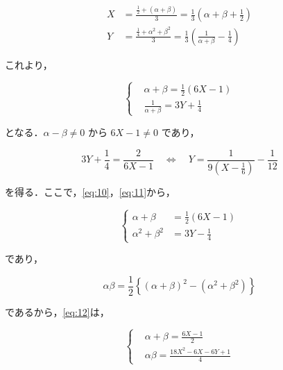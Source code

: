 \documentclass[a4paper]{ltjsarticle}
\begin{document}
\begin{align}
    X & =\frac{\frac{1}{2}+(\alpha+\beta)}{3}=\frac{1}{3}\left(\alpha+\beta+\frac{1}{2}\right)\label{eq:10}             \\
    Y & =\frac{\frac{1}{4}+\alpha^2+\beta^2}{3}=\frac{1}{3}\left(\frac{1}{\alpha+\beta}-\frac{1}{4}\right)\label{eq:11}
\end{align}

これより，

\begin{equation}
    \left\{\begin{aligned}
         & \alpha+\beta=\frac{1}{2}(6X-1)        \\
         & \frac{1}{\alpha+\beta}=3Y+\frac{1}{4}
    \end{aligned}\right.\label{eq:12}
\end{equation}

となる．$\alpha-\beta\neq 0$ から $6X-1\neq 0$ であり，

\begin{equation}
    3Y+\frac{1}{4}=\frac{2}{6X-1}\quad\Longleftrightarrow\quad Y=\frac{1}{9(X-\frac{1}{6})}-\frac{1}{12}\label{eq:13}
\end{equation}

を得る．ここで，\eqref{eq:10}，\eqref{eq:11}から，

\begin{equation*}
    \left\{\begin{aligned}
        \alpha+\beta     & =\frac{1}{2}(6X-1) \\
        \alpha^2+\beta^2 & =3Y-\frac{1}{4}
    \end{aligned}\right.
\end{equation*}

であり，

\begin{equation*}
    \alpha\beta = \frac{1}{2}\left\{\left(\alpha+\beta\right)^2-\left(\alpha^2+\beta^2\right)\right\}
\end{equation*}

であるから，\eqref{eq:12}は，

\begin{equation}
    \left\{\begin{aligned}
         & \alpha+\beta=\frac{6X-1}{2}         \\
         & \alpha\beta=\frac{18X^2-6X-6Y+1}{4}
    \end{aligned}\right.\label{eq:14}
\end{equation}
\end{document}
